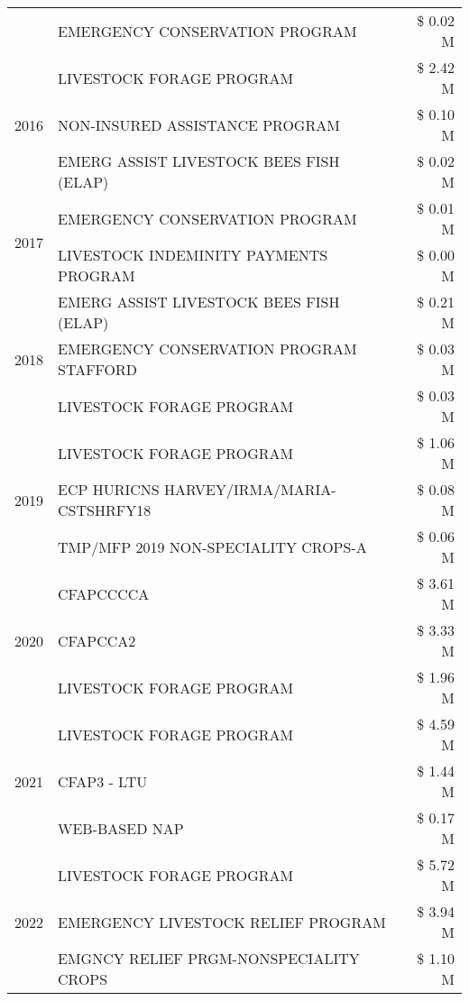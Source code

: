 \begin{tabular}{llr}
 & EMERGENCY CONSERVATION PROGRAM & \$ 0.02 M \\
\cline{1-3}
\multirow[t]{3}{*}{2016} & LIVESTOCK FORAGE PROGRAM & \$ 2.42 M \\
 & NON-INSURED ASSISTANCE PROGRAM & \$ 0.10 M \\
 & EMERG ASSIST LIVESTOCK BEES FISH (ELAP) & \$ 0.02 M \\
\cline{1-3}
\multirow[t]{2}{*}{2017} & EMERGENCY CONSERVATION PROGRAM & \$ 0.01 M \\
 & LIVESTOCK INDEMINITY PAYMENTS PROGRAM & \$ 0.00 M \\
\cline{1-3}
\multirow[t]{3}{*}{2018} & EMERG ASSIST LIVESTOCK BEES FISH (ELAP) & \$ 0.21 M \\
 & EMERGENCY CONSERVATION PROGRAM STAFFORD & \$ 0.03 M \\
 & LIVESTOCK FORAGE PROGRAM & \$ 0.03 M \\
\cline{1-3}
\multirow[t]{3}{*}{2019} & LIVESTOCK FORAGE PROGRAM & \$ 1.06 M \\
 & ECP HURICNS HARVEY/IRMA/MARIA-CSTSHRFY18 & \$ 0.08 M \\
 & TMP/MFP 2019 NON-SPECIALITY CROPS-A & \$ 0.06 M \\
\cline{1-3}
\multirow[t]{3}{*}{2020} & CFAPCCCCA & \$ 3.61 M \\
 & CFAPCCA2 & \$ 3.33 M \\
 & LIVESTOCK FORAGE PROGRAM & \$ 1.96 M \\
\cline{1-3}
\multirow[t]{3}{*}{2021} & LIVESTOCK FORAGE PROGRAM & \$ 4.59 M \\
 & CFAP3 - LTU & \$ 1.44 M \\
 & WEB-BASED NAP & \$ 0.17 M \\
\cline{1-3}
\multirow[t]{3}{*}{2022} & LIVESTOCK FORAGE PROGRAM & \$ 5.72 M \\
 & EMERGENCY LIVESTOCK RELIEF PROGRAM & \$ 3.94 M \\
 & EMGNCY RELIEF PRGM-NONSPECIALITY CROPS & \$ 1.10 M \\
\cline{1-3}
\bottomrule
\end{tabular}
